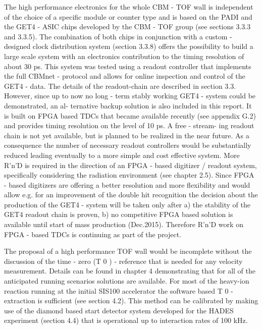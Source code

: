 The high performance electronics for the whole CBM - TOF wall is independent of the choice of a specific
module or counter type and is based on the PADI and the GET4 - ASIC chips developed by the CBM -
TOF group (see sections 3.3.3 and 3.3.5). The combination of both chips in conjunction with a custom -
designed clock distribution system (section 3.3.8) offers the possibility to build a large scale system with
an electronics contribution to the timing resolution of about 30 ps. This system was tested using a readout
controller that implements the full CBMnet - protocol and allows for online inspection and control of the
GET4 - data. The details of the readout-chain are described in section 3.3.
However, since up to now no long - term stably working GET4 - system could be demonstrated, an al-
ternative backup solution is also included in this report. It is built on FPGA based TDCs that became
available recently (see appendix G.2) and provides timing resolution on the level of 10 ps. A free - stream-
ing readout chain is not yet available, but is planned to be realized in the near future. As a consequence
the number of necessary readout controllers would be substantially reduced leading eventually to a more
simple and cost effective system. More R'n'D is required in the direction of an FPGA - based digitizer /
readout system, specifically considering the radiation environment (see chapter 2.5).
Since FPGA - based digitizers are offering a better resolution and more flexibility and would allow e.g.
for an improvement of the double hit recognition the decision about the production of the GET4 - system
will be taken only after a) the stability of the GET4 readout chain is proven, b) no competitive FPGA
based solution is available until start of mass production (Dec.2015). Therefore R'n'D work on FPGA -
based TDCs is continuing as part of the project.

The proposal of a high performance TOF wall would be incomplete without the discussion of the time
- zero (T 0 ) - reference that is needed for any velocity measurement. Details can be found in chapter 4
demonstrating that for all of the anticipated running scenarios solutions are available. For most of the
heavy-ion reaction running at the initial SIS100 accelerator the software based T 0 - extraction is sufficient
(see section 4.2). This method can be calibrated by making use of the diamond based start detector
system developed for the HADES experiment (section 4.4) that is operational up to interaction rates of
100 kHz.


